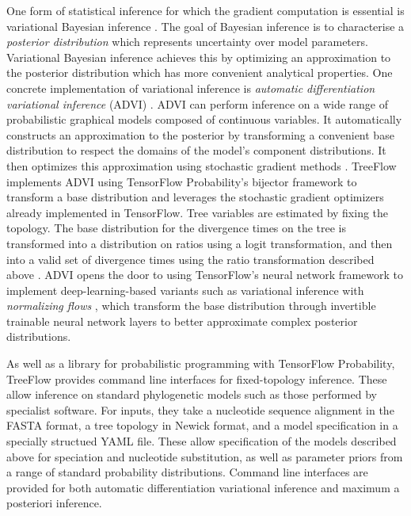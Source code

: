 One form of statistical inference for which the gradient computation is essential is variational Bayesian inference \cite{jordan1999introduction}. The goal of Bayesian inference is to characterise a \textit{posterior distribution} which represents uncertainty over model parameters. Variational Bayesian inference achieves this by optimizing an approximation to the posterior distribution which has more convenient analytical properties. One concrete implementation of variational inference is \textit{automatic differentiation variational inference} (ADVI) \cite{kucukelbir2017automatic}. ADVI can perform inference on a wide range of probabilistic graphical models composed of continuous variables. It automatically constructs an approximation to the posterior by transforming a convenient base distribution to respect the domains of the model's component distributions. It then optimizes this approximation using stochastic gradient methods \cite{robbins1951stochastic, bottou2010large}. TreeFlow implements ADVI using TensorFlow Probability's bijector framework to transform a base distribution and leverages the stochastic gradient optimizers already implemented in TensorFlow. Tree variables are estimated by fixing the topology. The base distribution for the divergence times on the tree is transformed into a distribution on ratios using a logit transformation, and then into a valid set of divergence times using the ratio transformation described above \cite{yang2007paml}. ADVI opens the door to using TensorFlow's neural network framework to implement deep-learning-based variants such as variational inference with \textit{normalizing flows} \cite{rezende2015variational}, which transform the base distribution through invertible trainable neural network layers to better approximate complex posterior distributions.

As well as a library for probabilistic programming with TensorFlow Probability, TreeFlow provides command line interfaces for fixed-topology inference. These allow inference on standard phylogenetic models such as those performed by specialist software. For inputs, they take a nucleotide sequence alignment in the FASTA format, a tree topology in Newick format, and a model specification in a specially structued YAML file. These allow specification of the models described above for speciation and nucleotide substitution, as well as parameter priors from a range of standard probability distributions. Command line interfaces are provided for both automatic differentiation variational inference and maximum a posteriori inference.

